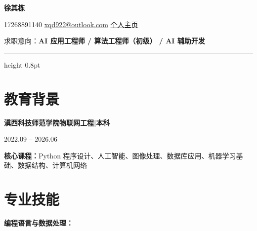 \documentclass[10pt,a4paper]{article}
\begin{document}
\begin{center}
    {\fontsize{26}{32}\selectfont\bfseries\color{primary} 徐其栋}

    \vspace{0.15em}

    {\color{graytext}
    \faPhone\hspace{0.3em}17268891140
    \hspace{1.2em}
    \faEnvelope\hspace{0.3em}\href{mailto:xqd922@outlook.com}{xqd922@outlook.com}
    \hspace{1.2em}
    \faGlobe\hspace{0.3em}\href{https://1001.pp.ua}{个人主页}}

    \vspace{0.5em}

    {\color{darktext} 求职意向：\textbf{\color{primary}AI 应用工程师 / 算法工程师（初级） / AI 辅助开发}}
\end{center}

\vspace{0.2em}
{\color{rulecolor}\hrule height 0.8pt}

\section{\faGraduationCap\hspace{0.4em}教育背景}

{\bfseries 滇西科技师范学院}\hfill{\bfseries 物联网工程\hspace{0.3em}|\hspace{0.3em}本科}

{\color{graytext} 2022.09 -- 2026.06}

\vspace{0.2em}

{\color{darktext}
\textbf{核心课程：}Python 程序设计、人工智能、图像处理、数据库应用、机器学习基础、数据结构、计算机网络
}

\section{\faCogs\hspace{0.4em}专业技能}

{\bfseries\color{primary}编程语言与数据处理：}
\end{document}

